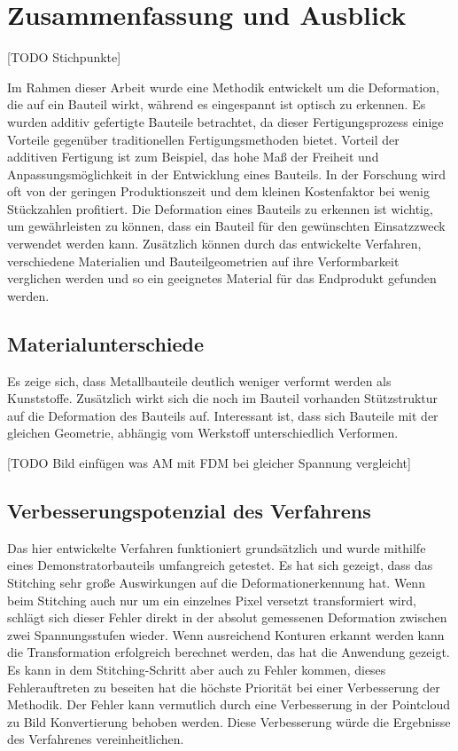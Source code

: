 
\chapter{Zusammenfassung und Ausblick}

[TODO Stichpunkte]

Im Rahmen dieser Arbeit wurde eine Methodik entwickelt um 
die Deformation, die auf ein Bauteil wirkt, während es eingespannt 
ist optisch zu erkennen. Es wurden additiv gefertigte Bauteile 
betrachtet, da dieser Fertigungsprozess einige Vorteile gegenüber
traditionellen Fertigungsmethoden bietet. 
Vorteil der additiven Fertigung ist zum Beispiel, das hohe Maß der Freiheit und 
Anpassungsmöglichkeit in der Entwicklung eines Bauteils. In der Forschung 
wird oft von der geringen Produktionszeit und dem kleinen Kostenfaktor 
bei wenig Stückzahlen profitiert. Die Deformation eines Bauteils zu 
erkennen ist wichtig, um gewährleisten zu können, dass ein Bauteil für 
den gewünschten Einsatzzweck verwendet werden kann. Zusätzlich können 
durch das entwickelte Verfahren, verschiedene Materialien und Bauteilgeometrien 
auf ihre Verformbarkeit verglichen werden und so ein geeignetes Material 
für das Endprodukt gefunden werden.

\section{Materialunterschiede}

Es zeige sich, dass Metallbauteile deutlich weniger verformt werden als 
Kunststoffe. Zusätzlich wirkt sich die noch im Bauteil vorhanden Stützstruktur 
auf die Deformation des Bauteils auf. 
Interessant ist, dass sich Bauteile mit der gleichen Geometrie, abhängig vom 
Werkstoff unterschiedlich Verformen. 

[TODO Bild einfügen was AM mit FDM bei gleicher Spannung vergleicht]

\section{Verbesserungspotenzial des Verfahrens}

Das hier entwickelte Verfahren funktioniert grundsätzlich und wurde mithilfe 
eines Demonstratorbauteils umfangreich getestet. Es hat sich gezeigt, dass 
das Stitching sehr große Auswirkungen auf die Deformationerkennung hat. 
Wenn beim Stitching auch nur um ein einzelnes Pixel versetzt transformiert wird,
schlägt sich dieser Fehler direkt in der absolut gemessenen 
Deformation zwischen zwei Spannungsstufen wieder.
Wenn ausreichend Konturen erkannt werden kann die Transformation erfolgreich
berechnet werden, das hat die Anwendung gezeigt. Es kann in dem Stitching-Schritt
aber auch zu Fehler kommen, dieses Fehlerauftreten zu beseiten hat die höchste Priorität 
bei einer Verbesserung der Methodik. 
Der Fehler kann vermutlich durch eine Verbesserung in der Pointcloud zu Bild 
Konvertierung behoben werden. Diese Verbesserung würde die Ergebnisse 
des Verfahrenes vereinheitlichen. 

